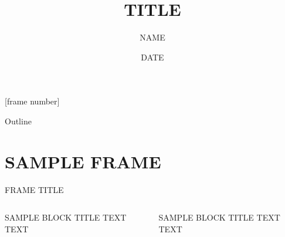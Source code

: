 

\usepackage{bibentry}

[frame number]
\beamertemplatenavigationsymbolsempty




\title{TITLE}
\author{NAME}
\date{DATE}

\begin{frame}
    \maketitle
\end{frame}

\begin{frame}{Outline}
    \tableofcontents
\end{frame}

\section{SAMPLE FRAME}
\begin{frame}{FRAME TITLE}
    \begin{columns}
        \begin{block}{SAMPLE BLOCK TITLE}
            TEXT TEXT
        \end{block}
        \begin{block}{SAMPLE BLOCK TITLE}
            TEXT TEXT
        \end{block}
    \end{columns}
\end{frame}


